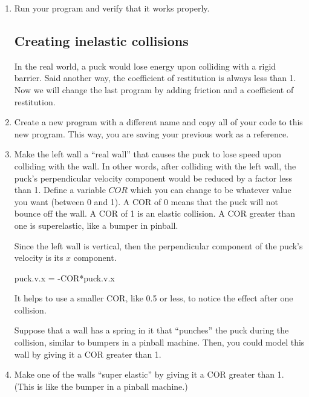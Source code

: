 \begin{enumerate}
\item Run your program and verify that it works properly.

\subsection*{Creating inelastic collisions}

In the real world, a puck would lose energy upon colliding with a rigid barrier. Said another way, the coefficient of restitution is always less than 1. Now we will change the last program by adding friction and a coefficient of restitution.

\item Create a new program with a different name and copy all of your code to this new program. This way, you are saving your previous work as a reference.

\item Make the left wall a ``real wall'' that causes the puck to lose speed upon colliding with the wall. In other words, after colliding with the left wall, the puck's perpendicular velocity component would be reduced by a factor less than 1. Define a variable $COR$ which you can change to be whatever value you want (between 0 and 1).  A COR of 0 means that the puck will not bounce off the wall. A COR of 1 is an elastic collision. A COR greater than one is superelastic, like a bumper in pinball.

Since the left wall is vertical, then the perpendicular component of the puck's velocity is its $x$ component.

\begin{myvpython}
        puck.v.x = -COR*puck.v.x
\end{myvpython}

It helps to use a smaller COR, like 0.5 or less, to notice the effect after one collision.


Suppose that a wall has a spring in it that ``punches'' the puck during the collision, similar to bumpers in a pinball machine. Then, you could model this wall by giving it a COR greater than 1.

\item Make one of the walls ``super elastic'' by giving it a COR greater than 1. (This is like the bumper in a pinball machine.)


\end{enumerate}
